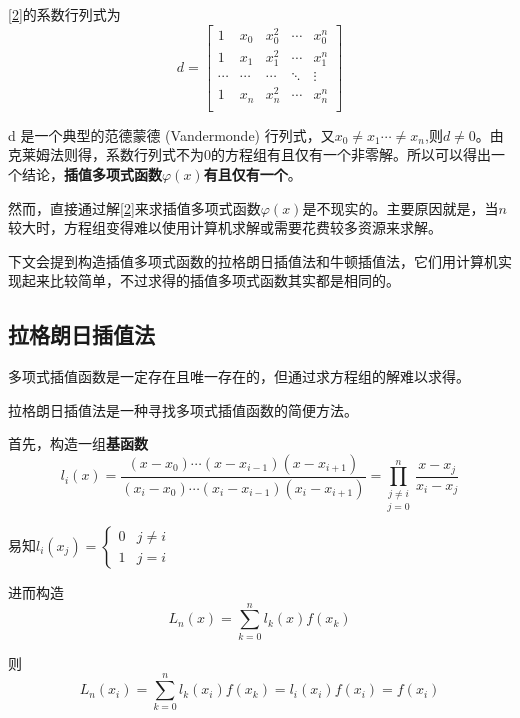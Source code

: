 \documentclass[withoutpreface]{cumcmthesis}
\begin{document}
\cref{2}的系数行列式为
\begin{equation}
    d=
    \begin{bmatrix}
        1      & x_0    & x_0^2  & \cdots & x_0^n  \\
        1      & x_1    & x_1^2  & \cdots & x_1^n  \\
        \cdots & \cdots & \cdots & \ddots & \vdots \\
        1      & x_n    & x_n^2  & \cdots & x_n^n  \\
    \end{bmatrix}
\end{equation}

d 是一个典型的范德蒙德 (Vandermonde) 行列式，又$x_0\ne x_1 \cdots \ne x_n$,则$d\ne 0$。由克莱姆法则得，系数行列式不为0的方程组有且仅有一个非零解。所以可以得出一个结论，\textbf{插值多项式函数$\varphi(x)$有且仅有一个}。

然而，直接通过解\cref{2}来求插值多项式函数$\varphi(x)$是不现实的。主要原因就是，当$n$较大时，方程组变得难以使用计算机求解或需要花费较多资源来求解。

下文会提到构造插值多项式函数的拉格朗日插值法和牛顿插值法，它们用计算机实现起来比较简单，不过求得的插值多项式函数其实都是相同的。

\subsection{拉格朗日插值法}

多项式插值函数是一定存在且唯一存在的，但通过求方程组的解难以求得。

拉格朗日插值法是一种寻找多项式插值函数的简便方法。

首先，构造一组\textbf{基函数}
\begin{equation}
    l_i(x) = \frac{(x-x_0)\cdots(x-x_{i-1})(x-x_{i+1})}{(x_i-x_0)\cdots(x_i-x_{i-1})(x_i-x_{i+1})}
    =\underset{j=0}{\prod \limits_{j\ne i}^n}\ \frac{x-x_j}{x_i-x_j}
\end{equation}

易知$l_i(x_j)=\begin{cases}
        0 & j\ne i \\
        1 & j=i
    \end{cases}$

进而构造
\begin{equation}
    L_n(x) = \sum\limits_{k=0}^{n} l_k(x)f(x_k)
\end{equation}

则
\begin{equation*}
    L_n(x_i) = \sum\limits_{k=0}^{n} l_k(x_i)f(x_k)=l_i(x_i)f(x_i) = f(x_i)
\end{equation*}
\end{document}

